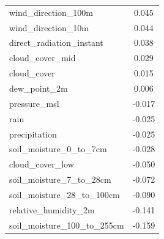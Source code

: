\begin{table}[H]
\begin{tabular}{lc}
		wind\_direction\_100m & 0.045 \\
		wind\_direction\_10m & 0.044 \\
		direct\_radiation\_instant & 0.038 \\
		cloud\_cover\_mid & 0.029 \\
		cloud\_cover & 0.015 \\
		dew\_point\_2m & 0.006 \\
		pressure\_msl & -0.017 \\
		rain & -0.025 \\
		precipitation & -0.025 \\
		soil\_moisture\_0\_to\_7cm & -0.028 \\
		cloud\_cover\_low & -0.050 \\
		soil\_moisture\_7\_to\_28cm & -0.072 \\
		soil\_moisture\_28\_to\_100cm & -0.090 \\
		relative\_humidity\_2m & -0.141 \\
		soil\_moisture\_100\_to\_255cm & -0.159 \\
	\end{tabular}
\end{table}

